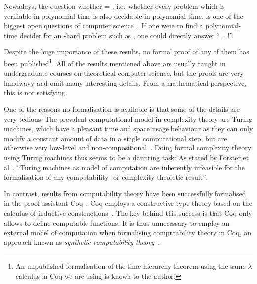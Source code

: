 Nowadays, the question whether \PC{} = \NP{}, i.e.\ whether every problem which is verifiable in polynomial time is also decidable in polynomial time, is one of the biggest open questions of computer science~\cite{claymath}. 
If one were to find a polynomial-time decider for an \NP{}-hard problem such as \SAT{}, one could directly answer ``\PC{}= \NP{}!''.

Despite the huge importance of these results, no formal proof of any of them has been published\footnote{An unpublished formalisation of the time hierarchy theorem using the same $\lambda$ calculus in Coq we are using is known to the author.}. All of the results mentioned above are usually taught in undergraduate courses on theoretical computer science, but the proofs are very handwavy and omit many interesting details. From a mathematical perspective, this is not satisfying.

One of the reasons no formalisation is available is that some of the details are very tedious. The prevalent computational model in complexity theory are Turing machines, which have a pleasant time and space usage behaviour as they can only modify a constant amount of data in a single computational step, but are otherwise very low-level and non-compositional~\cite{ForsterEtAl:2019:VerifiedTMs}.
Doing formal complexity theory using Turing machines thus seems to be a daunting task: As stated by Forster et al~\cite{ForsterEtAl:2019:VerifiedTMs}, ``Turing machines as model of computation are inherently infeasible for the formalisation of any computability- or complexity-theoretic result''. 

In contrast, results from computability theory have been successfully formalised in the proof assistant Coq~\cite{coqweb}. Coq employs a constructive type theory based on the calculus of inductive constructions~\cite{iclnotes}. The key behind this success is that Coq only allows to define computable functions. It is thus unnecessary to employ an external model of computation when formalising computability theory in Coq, an approach known as \textit{synthetic computability theory}~\cite{ForsterEtAl:2018:On-Synthetic-Undecidability}.

